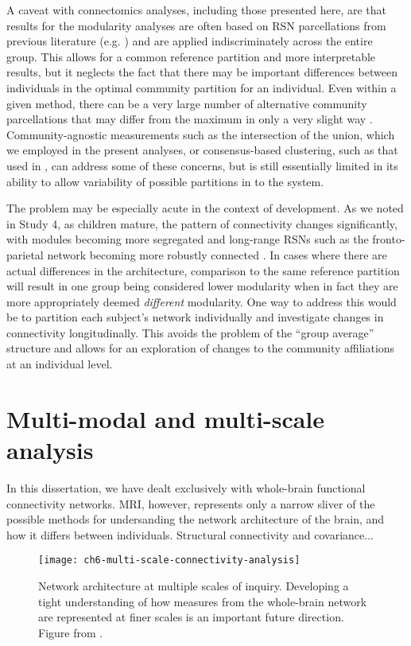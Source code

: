 A caveat with connectomics analyses, including those presented here, are that results for the modularity analyses are often based on RSN parcellations from previous literature (e.g. \citep{Power2011}) and are applied indiscriminately across the entire group. This allows for a common reference partition and more interpretable results, but it neglects the fact that there may be important differences between individuals in the optimal community partition for an individual. Even within a given method, there can be a very large number of alternative community parcellations that may differ from the maximum in only a very slight way \citep{Good2010}. Community-agnostic measurements such as the intersection of the union, which we employed in the present analyses, or consensus-based clustering, such as that used in \citep{Power2011}, can address some of these concerns, but is still essentially limited in its ability to allow variability of possible partitions in to the system. 

The problem may be especially acute in the context of development. As we noted in Study 4, as children mature, the pattern of connectivity changes significantly, with modules becoming more segregated and long-range RSNs such as the fronto-parietal network becoming more robustly connected \citep{Cao2016}. In cases where there are actual differences in the architecture, comparison to the same reference partition will result in one group being considered lower modularity when in fact they are more appropriately deemed \textit{different} modularity. One way to address this would be to partition each subject's network individually and investigate changes in connectivity longitudinally. This avoids the problem of the ``group average'' structure and allows for an exploration of changes to the community affiliations at an individual level. 

\section{Multi-modal and multi-scale analysis}

In this dissertation, we have dealt exclusively with whole-brain functional connectivity networks. MRI, however, represents only a narrow sliver of the possible methods for undersanding the network architecture of the brain, and how it differs between individuals. Structural connectivity and covariance... 

\begin{figure}[t]
	\centering
	\texttt{[image: ch6-multi-scale-connectivity-analysis]}
	\caption[Network architecture at multiple scales.]{Network architecture at multiple scales of inquiry. Developing a tight understanding of how measures from the whole-brain network are represented at finer scales is an important future direction. Figure from \citep{Petersen2015}.}
	\label{fig:ch6-multi-scale-connectivity-analysis}
\end{figure}


